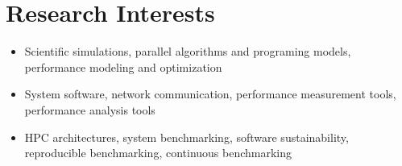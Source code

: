 \section{Research Interests}
\begin{itemize}
\item Scientific simulations, parallel algorithms and programing models, performance modeling and optimization
\item System software, network communication, performance measurement tools, performance analysis tools
\item HPC architectures, system benchmarking, software sustainability, reproducible benchmarking, continuous benchmarking
\end{itemize}

